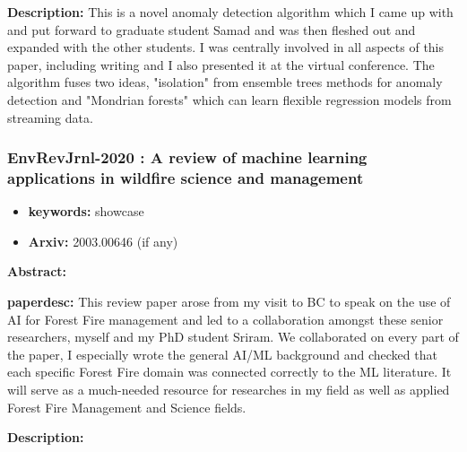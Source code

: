 \documentclass{article}
\begin{document}
\textbf{Description:} This is a novel anomaly detection algorithm which I came up with and put forward to graduate student Samad and was then fleshed out and expanded with the other students. I was centrally involved in all aspects of this paper, including writing and I also presented it at the virtual conference. 
    The algorithm fuses two ideas, "isolation" from ensemble trees methods for anomaly detection and "Mondrian forests" which can learn flexible regression models from streaming data.



\newpage
\subsubsection{\textbf{EnvRevJrnl-2020} : A review of machine learning applications in wildfire science and management}
\begin{itemize}
\item \textbf{keywords:} showcase
\item \textbf{Arxiv:} 2003.00646 (if any)
\end{itemize}


\textbf{Abstract:} 

\textbf{paperdesc:} This review paper arose from my visit to BC to speak on the use of AI for Forest Fire management and led to a collaboration amongst these senior researchers, myself and my PhD student Sriram. We collaborated on every part of the paper, I especially wrote the general AI/ML background and checked that each specific Forest Fire domain was connected correctly to the ML literature. It will serve as a much-needed resource for researches in my field as well as applied Forest Fire Management and Science fields.

\textbf{Description:} 
\end{document}
